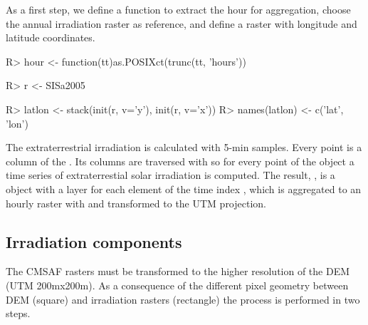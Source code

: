 \documentclass[article]{jss}
\begin{document}
As a first step, we define a function to extract the hour for
aggregation, choose the annual irradiation raster as reference, and
define a raster with longitude and latitude coordinates.
\begin{CodeChunk}
\begin{CodeInput}
R> hour <- function(tt)as.POSIXct(trunc(tt, 'hours'))

R> r <- SISa2005

R> latlon <- stack(init(r, v='y'), init(r, v='x'))
R> names(latlon) <- c('lat', 'lon')
\end{CodeInput}
\end{CodeChunk}


The extraterrestrial irradiation is calculated with 5-min
samples. Every point is a column of the 
. Its columns are traversed with  so for
every point of the  object a time series of
extraterrestial solar irradiation is computed.  The result,
, is a  object with a layer for
each element of the time index , which is aggregated to
an hourly raster with  and transformed to the UTM
projection.

\begin{CodeChunk}
\end{CodeChunk}

\subsection{Irradiation components}
\label{sec-1-4}

The CMSAF rasters must be transformed to the higher resolution of
the DEM (UTM 200mx200m). As a consequence of the different pixel
geometry between DEM (square) and irradiation rasters (rectangle)
the process is performed in two steps. 
\end{document}
